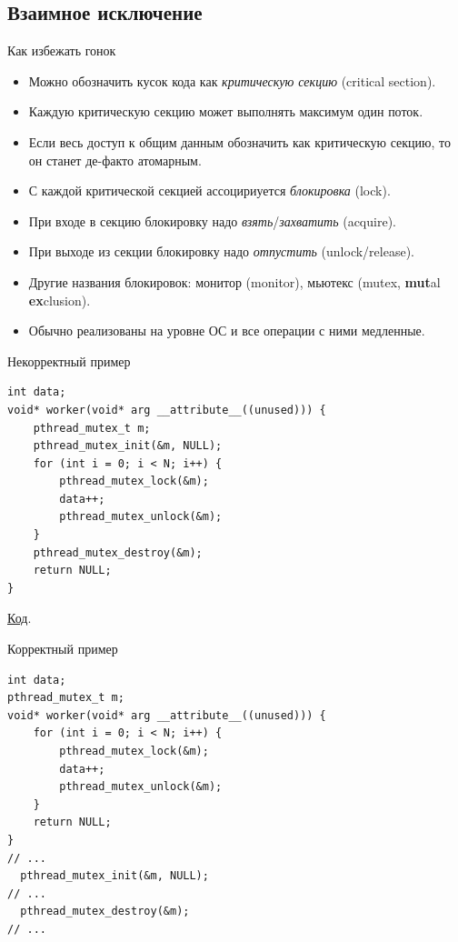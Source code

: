 \subsection{Взаимное исключение}

\begin{frame}
\end{frame}

\begin{frame}{Как избежать гонок}
	\begin{itemize}
		\item Можно обозначить кусок кода как \textit{критическую секцию} (critical section).
		\item Каждую критическую секцию может выполнять максимум один поток.
		\item
			Если весь доступ к общим данным обозначить как критическую секцию,
			то он станет де-факто атомарным.
		\item С каждой критической секцией ассоцириуется \textit{блокировка} (lock).
		\item При входе в секцию блокировку надо \textit{взять}/\textit{захватить} (acquire).
		\item При выходе из секции блокировку надо \textit{отпустить} (unlock/release).
		\item Другие названия блокировок: монитор (monitor), мьютекс (mutex, \textbf{mut}al \textbf{ex}clusion).
		\item Обычно реализованы на уровне ОС и все операции с ними медленные.
	\end{itemize}
\end{frame}

\begin{frame}[fragile]{Некорректный пример}
\begin{verbatim}
int data;
void* worker(void* arg __attribute__((unused))) {
    pthread_mutex_t m;
    pthread_mutex_init(&m, NULL);
    for (int i = 0; i < N; i++) {
        pthread_mutex_lock(&m);
        data++;
        pthread_mutex_unlock(&m);
    }
    pthread_mutex_destroy(&m);
    return NULL;
}
\end{verbatim}
\href{https://github.com/yeputons/fall-2017-paradigms/raw/master/171023/sources/09-two-threads-bad-mutex.cpp}{Код}.
\end{frame}

\begin{frame}[fragile]{Корректный пример}
\begin{verbatim}
int data;
pthread_mutex_t m;
void* worker(void* arg __attribute__((unused))) {
    for (int i = 0; i < N; i++) {
        pthread_mutex_lock(&m);
        data++;
        pthread_mutex_unlock(&m);
    }
    return NULL;
}
// ...
  pthread_mutex_init(&m, NULL);
// ...
  pthread_mutex_destroy(&m);
// ...
\end{verbatim}
\end{frame}

